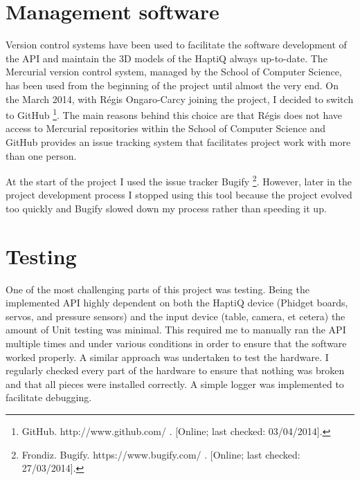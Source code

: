 \section{Management software}
Version control systems have been used to facilitate the software development of the API and maintain the 3D models of the HaptiQ always up-to-date. The Mercurial version control system, managed by the School of Computer Science, has been used from the beginning of the project until almost the very end. On the  March 2014, with Régis Ongaro-Carcy joining the project, I decided to switch to GitHub \footnote{GitHub. http://www.github.com/ . [Online; last checked: 03/04/2014].}. The main reasons behind this choice are that Régis does not have access to Mercurial repositories within the School of Computer Science and GitHub provides an issue tracking system that facilitates project work with more than one person.  

At the start of the project I used the issue tracker Bugify \footnote{Frondiz. Bugify. https://www.bugify.com/ . [Online; last checked: 27/03/2014].}. However, later in the project development process I stopped using this tool because the project evolved too quickly and Bugify slowed down my process rather than speeding it up. 

\section{Testing}
One of the most challenging parts of this project was testing. Being the implemented API highly dependent on both the HaptiQ device (Phidget boards, servos, and pressure sensors) and the input device (table, camera, et cetera) the amount of Unit testing was minimal. This required me to manually ran the API multiple times and under various conditions in order to ensure that the software worked properly. A similar approach was undertaken to test the hardware. I regularly checked every part of the hardware to ensure that nothing was broken and that all pieces were installed correctly.
A simple logger was implemented to facilitate debugging.